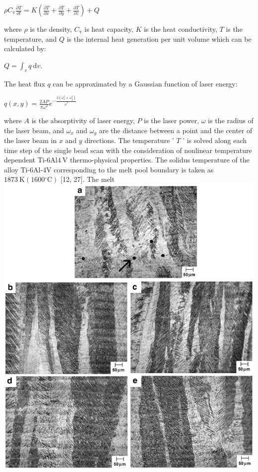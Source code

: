 \documentclass[10pt]{article}
\begin{document}
$\rho C_{\mathrm{v}} \frac{\partial T}{\partial t}=K\left(\frac{\partial T}{\partial x}+\frac{\partial T}{\partial y}+\frac{\partial T}{\partial z}\right)+Q$

where $\rho$ is the density, $C_{\mathrm{v}}$ is heat capacity, $K$ is the heat conductivity, $T$ is the temperature, and $Q$ is the internal heat generation per unit volume which can be calculated by:

$Q=\int_{v} q \mathrm{~d} v$.

The heat flux $q$ can be approximated by a Gaussian function of laser energy:

$q(x, y)=\frac{2 A P}{\pi \omega^{2}} e^{-\frac{2\left(\omega_{x}^{2}+\omega_{y}^{2}\right)}{\omega^{2}}}$

where $A$ is the absorptivity of laser energy, $P$ is the laser power, $\omega$ is the radius of the laser beam, and $\omega_{x}$ and $\omega_{y}$ are the distance between a point and the center of the laser beam in $x$ and $y$ directions. The temperature ' $T$ ' is solved along each time step of the single bead scan with the consideration of nonlinear temperature dependent Ti-6Al$4 \mathrm{~V}$ thermo-physical properties. The solidus temperature of the alloy Ti-6Al-4V corresponding to the melt pool boundary is taken as $1873 \mathrm{~K}\left(1600{ }^{\circ} \mathrm{C}\right)$ [12, 27]. The melt\\
\includegraphics[max width=\textwidth, center]{2024_02_28_5b6806184856c64a957ag-10}
\end{document}
